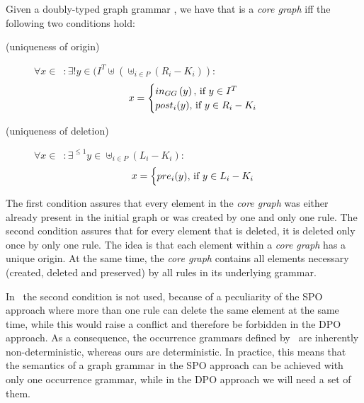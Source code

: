 \begin{definition}\label{def:core-graph} Given a doubly-typed graph grammar \doublyTypedGraphGrammarCore{}, we have that \coreGraph{} is a \emph{core graph} iff the following two conditions hold:

\begin{description}

  \item[(uniqueness of origin)] \mbox{$\forall x \in$ \coreGraph $: \exists! y \in (I^T \uplus (\uplus_{i \in P} (R_i - K_i))$}:
\[ x =
    \begin{cases}
      in_{GG}\parens{y},$ if $y \in I^T\\
      post_i(y),$ if $y \in R_i - K_i\\
    \end{cases}
   \]

 \item[(uniqueness of deletion)] \mbox{$\forall x \in$ \coreGraph $: \exists^{\leq1} y \in \uplus_{i \in P} (L_i - K_i)$}:
\[ x =
    \begin{cases}
      pre_i(y),$ if $y \in L_i - K_i\\
    \end{cases}
   \]\end{description}

\end{definition}
  The first condition assures that every element in the \emph{core graph} was either already present in the initial graph or was created by one and only one rule. The second condition assures that for every element that is deleted, it is deleted only once by only one rule. The idea is that each element within a \emph{core graph} has a unique origin. At the same time, the \emph{core graph} contains all elements necessary (created, deleted and preserved) by all rules in its underlying grammar. 
  
  In~\cite{Ribeiro1996} the second condition is not used, because of a peculiarity of the SPO approach where more than one rule can delete the same element at the same time, while this would raise a conflict and therefore be forbidden in the DPO approach. As a consequence, the occurrence grammars defined by~\cite{Ribeiro1996} are inherently non-deterministic, whereas ours are deterministic.  In practice, this means that the semantics of a graph grammar in the SPO approach can be achieved with only one occurrence grammar, while in the DPO approach we will need a set of them.


